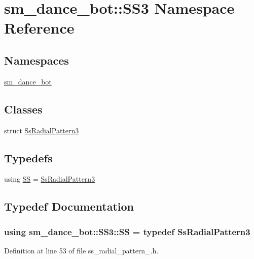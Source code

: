\hypertarget{namespacesm__dance__bot_1_1SS3}{}\section{sm\+\_\+dance\+\_\+bot\+:\+:S\+S3 Namespace Reference}
\label{namespacesm__dance__bot_1_1SS3}
\subsection*{Namespaces}
\begin{DoxyCompactItemize}
\item 
 \hyperlink{namespacesm__dance__bot_1_1SS3_1_1sm__dance__bot}{sm\+\_\+dance\+\_\+bot}
\end{DoxyCompactItemize}
\subsection*{Classes}
\begin{DoxyCompactItemize}
\item 
struct \hyperlink{structsm__dance__bot_1_1SS3_1_1SsRadialPattern3}{Ss\+Radial\+Pattern3}
\end{DoxyCompactItemize}
\subsection*{Typedefs}
\begin{DoxyCompactItemize}
\item 
using \hyperlink{namespacesm__dance__bot_1_1SS3_aba7ea37bc21bc69fc2c374bd831c7ab1}{SS} = \hyperlink{structsm__dance__bot_1_1SS3_1_1SsRadialPattern3}{Ss\+Radial\+Pattern3}
\end{DoxyCompactItemize}


\subsection{Typedef Documentation}
\subsubsection[{\texorpdfstring{SS}{SS}}]{\setlength{\rightskip}{0pt plus 5cm}using {\bf sm\+\_\+dance\+\_\+bot\+::\+S\+S3\+::\+SS} = typedef {\bf Ss\+Radial\+Pattern3}}\hypertarget{namespacesm__dance__bot_1_1SS3_aba7ea37bc21bc69fc2c374bd831c7ab1}{}\label{namespacesm__dance__bot_1_1SS3_aba7ea37bc21bc69fc2c374bd831c7ab1}


Definition at line 53 of file ss\+\_\+radial\+\_\+pattern\+\_.\+h.

